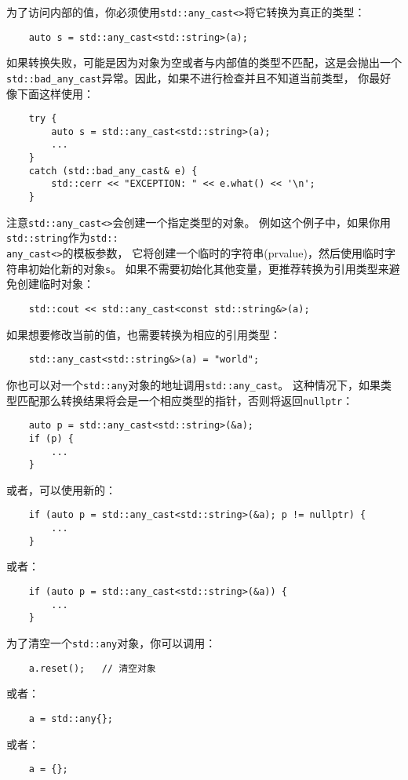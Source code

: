 为了访问内部的值，你必须使用\texttt{std::any\_cast<>}将它转换为真正的类型：
\begin{lstlisting}
    auto s = std::any_cast<std::string>(a);
\end{lstlisting}
如果转换失败，可能是因为对象为空或者与内部值的类型不匹配，这是会抛出一个
\texttt{std::bad\_any\_cast}异常。因此，如果不进行检查并且不知道当前类型，
你最好像下面这样使用：
\begin{lstlisting}
    try {
        auto s = std::any_cast<std::string>(a);
        ...
    }
    catch (std::bad_any_cast& e) {
        std::cerr << "EXCEPTION: " << e.what() << '\n';
    }
\end{lstlisting}
注意\texttt{std::any\_cast<>}会创建一个指定类型的对象。
例如这个例子中，如果你用\texttt{std::string}作为\texttt{std::\\
any\_cast<>}的模板参数，
它将创建一个临时的字符串(prvalue)，然后使用临时字符串初始化新的对象\texttt{s}。
如果不需要初始化其他变量，更推荐转换为引用类型来避免创建临时对象：
\begin{lstlisting}
    std::cout << std::any_cast<const std::string&>(a);
\end{lstlisting}
如果想要修改当前的值，也需要转换为相应的引用类型：
\begin{lstlisting}
    std::any_cast<std::string&>(a) = "world";
\end{lstlisting}
你也可以对一个\texttt{std::any}对象的地址调用\texttt{std::any\_cast}。
这种情况下，如果类型匹配那么转换结果将会是一个相应类型的指针，否则将返回\texttt{nullptr}：
\begin{lstlisting}
    auto p = std::any_cast<std::string>(&a);
    if (p) {
        ...
    }
\end{lstlisting}
或者，可以使用新的：
\begin{lstlisting}
    if (auto p = std::any_cast<std::string>(&a); p != nullptr) {
        ...
    }
\end{lstlisting}
或者：
\begin{lstlisting}
    if (auto p = std::any_cast<std::string>(&a)) {
        ...
    }
\end{lstlisting}
为了清空一个\texttt{std::any}对象，你可以调用：
\begin{lstlisting}
    a.reset();   // 清空对象
\end{lstlisting}
或者：
\begin{lstlisting}
    a = std::any{};
\end{lstlisting}
或者：
\begin{lstlisting}
    a = {};
\end{lstlisting}
